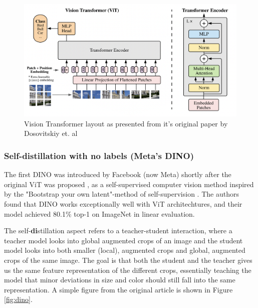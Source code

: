 \begin{figure}[H]
    \centering
    \includegraphics[width=1.1\linewidth]{examples/tests_eb/figs/vit.png}
    \caption{Vision Transformer layout as presented from it's original paper by Dosovitskiy et. al \cite{first_vit}}
    \label{fig:ViT}
\end{figure}

\subsubsection{Self-\textbf{di}stillation with \textbf{no} labels (Meta's \textbf{DINO})} \label{sssec:dino}
The first DINO was introduced by Facebook (now Meta) shortly after the original ViT was proposed \cite{dino1}, as a self-supervised computer vision method inspired by the "Bootstrap your own latent"-method of self-supervision \cite{byol}. The authors found that DINO works exceptionally well with ViT architechtures, and their model achieved 80.1\% top-1 on ImageNet in linear evaluation.  

The self-\textbf{di}stillation aspect refers to a teacher-student interaction, where a teacher model looks into global augmented crops of an image and the student model looks into both smaller (local), augmented crops and global, augmented crops of the same image. The goal is that both the student and the teacher gives us the same feature representation of the different crops, essentially teaching the model that minor deviations in size and color should still fall into the same representation. A simple figure from the original article is shown in Figure \ref{fig:dino}.

